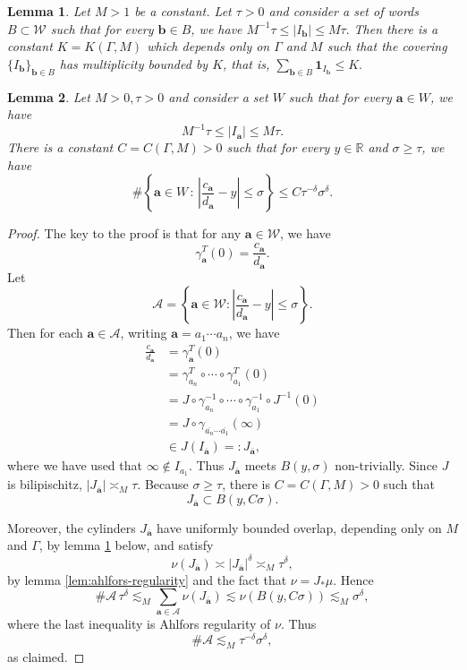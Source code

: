 \documentclass[10pt,a4paper]{amsart}
\newtheorem{lem}{Lemma}
\newcommand{\R}{\mathbb{R}}
\newcommand*\abs[1]{
	\left|#1\right|
}
\renewcommand{\geq}{\geqslant}
\renewcommand{\leq}{\leqslant}
\begin{document}
\begin{lem}
\label{lem:bounded-multiplicity}
Let $M > 1$ be a constant. Let $\tau > 0$ and consider a set of words $B \subset\mathcal{W}$ such that for every $\mathbf{b} \in B$, we have
$M^{-1}\tau \leq \abs{I_\mathbf{b}} \leq M\tau.$
Then there is a constant $K = K(\Gamma, M)$ which depends only on $\Gamma$ and $M$ such that the covering $\{I_\mathbf{b}\}_{\mathbf{b} \in B}$ has multiplicity bounded by $K$, that is,
$\sum_{\mathbf{b} \in B} \mathbf{1}_{I_\mathbf{b}} \leq K.$
\end{lem}

\begin{lem}\label{lem:NC-quotient}
Let $M > 0, \tau > 0$ and consider a set $W$ such that for every $\mathbf{a} \in W$, we have
\[M^{-1}\tau \leq \abs{I_\mathbf{a}} \leq M\tau.\]
There is a constant $C = C(\Gamma, M) > 0$ such that for every $y \in \R$ and $\sigma \geq \tau$, we have
\[\#\left\{\mathbf{a} \in W\,:\,\abs{\frac{c_\mathbf{a}}{d_\mathbf{a}} - y} \leq \sigma\right\} \leq C\tau^{-\delta}\sigma^{\delta}.\]
\end{lem}

\begin{proof}
The key to the proof is that for any $\mathbf{a} \in \mathcal{W}$, we have
\[
\gamma_\mathbf{a}^T(0)=\frac{c_\mathbf{a}}{d_\mathbf{a}}.
\]
Let
\[
\mathcal A=\left\{\mathbf{a}\in\mathcal W:\left|\frac{c_\mathbf{a}}{d_\mathbf{a}}-y\right|\le\sigma\right\}.
\]
Then for each $\mathbf a\in\mathcal A$, writing
$\mathbf{a} = a_1\cdots a_n$, we have
\begin{align*}
\frac{c_\mathbf a}{d_\mathbf a}
&=\gamma_\mathbf a^T(0)\\
&=\gamma_{a_n}^T\circ \cdots \circ \gamma_{a_1}^T(0)\\
&=J \circ \gamma_{a_n}^{-1}\circ \cdots \circ \gamma_{a_1}^{-1}\circ J^{-1}(0)\\
&=J\circ\gamma_{\overline{a_n}\cdots\overline{a_1}}(\infty)\\
&\in J(I_{\overline{\mathbf{a}}}) =: J_{\overline{\mathbf{a}}},
\end{align*}
where we have used that $\infty\notin I_{a_1}$. Thus
$J_{\overline{\mathbf a}}$ meets $B(y,\sigma)$ non-trivially. Since $J$ is bilipischitz,
$|J_{\overline{\mathbf a}}|\asymp_M\tau$. Because $\sigma\ge\tau$, there is
$C=C(\Gamma, M)>0$ such that
\[
J_{\overline{\mathbf a}}\subset B(y,C\sigma).
\]

Moreover, the cylinders $J_{\overline{\mathbf a}}$ have uniformly bounded
overlap, depending only on $M$ and $\Gamma$, by lemma \ref{lem:bounded-multiplicity} below, and satisfy
\[
\nu(J_{\overline{\mathbf a}})
\asymp |J_{\overline{\mathbf a}}|^\delta
\asymp_M \tau^\delta,
\]
by lemma \ref{lem:ahlfors-regularity} and the fact that $\nu = J_{*}\mu$. Hence
\[
\#\mathcal A\,\tau^\delta
\lesssim_M
\sum_{\mathbf a\in\mathcal A}\nu(J_{\overline{\mathbf a}})
\lesssim
\nu(B(y,C\sigma))
\lesssim_M
\sigma^\delta,
\]
where the last inequality is Ahlfors regularity of $\nu$. Thus
\[
\#\mathcal A\lesssim_M \tau^{-\delta}\sigma^\delta,
\]
as claimed.
\end{proof}
\end{document}
